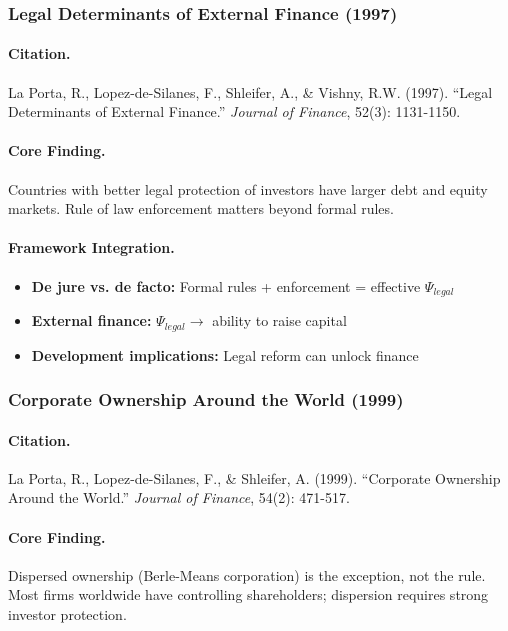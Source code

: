 \subsubsection{Legal Determinants of External Finance (1997)}

\paragraph{Citation.}
La Porta, R., Lopez-de-Silanes, F., Shleifer, A., \& Vishny, R.W. (1997).
``Legal Determinants of External Finance.'' \emph{Journal of Finance}, 52(3): 1131-1150.

\paragraph{Core Finding.}
Countries with better legal protection of investors have larger debt and
equity markets. Rule of law enforcement matters beyond formal rules.

\paragraph{Framework Integration.}
\begin{itemize}
  \item \textbf{De jure vs. de facto:} Formal rules + enforcement = effective $\Psi_{legal}$
  \item \textbf{External finance:} $\Psi_{legal} \to$ ability to raise capital
  \item \textbf{Development implications:} Legal reform can unlock finance
\end{itemize}

\subsubsection{Corporate Ownership Around the World (1999)}

\paragraph{Citation.}
La Porta, R., Lopez-de-Silanes, F., \& Shleifer, A. (1999).
``Corporate Ownership Around the World.'' \emph{Journal of Finance}, 54(2): 471-517.

\paragraph{Core Finding.}
Dispersed ownership (Berle-Means corporation) is the exception, not the rule.
Most firms worldwide have controlling shareholders; dispersion requires
strong investor protection.

